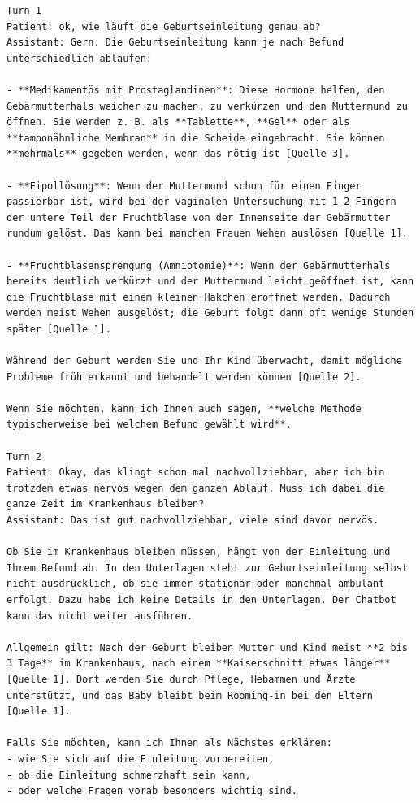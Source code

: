 \begin{Verbatim}[fontsize=\small,breaklines=true,breakanywhere=true]
Turn 1
Patient: ok, wie läuft die Geburtseinleitung genau ab?
Assistant: Gern. Die Geburtseinleitung kann je nach Befund unterschiedlich ablaufen:

- **Medikamentös mit Prostaglandinen**: Diese Hormone helfen, den Gebärmutterhals weicher zu machen, zu verkürzen und den Muttermund zu öffnen. Sie werden z. B. als **Tablette**, **Gel** oder als **tamponähnliche Membran** in die Scheide eingebracht. Sie können **mehrmals** gegeben werden, wenn das nötig ist [Quelle 3].

- **Eipollösung**: Wenn der Muttermund schon für einen Finger passierbar ist, wird bei der vaginalen Untersuchung mit 1–2 Fingern der untere Teil der Fruchtblase von der Innenseite der Gebärmutter rundum gelöst. Das kann bei manchen Frauen Wehen auslösen [Quelle 1].

- **Fruchtblasensprengung (Amniotomie)**: Wenn der Gebärmutterhals bereits deutlich verkürzt und der Muttermund leicht geöffnet ist, kann die Fruchtblase mit einem kleinen Häkchen eröffnet werden. Dadurch werden meist Wehen ausgelöst; die Geburt folgt dann oft wenige Stunden später [Quelle 1].

Während der Geburt werden Sie und Ihr Kind überwacht, damit mögliche Probleme früh erkannt und behandelt werden können [Quelle 2].

Wenn Sie möchten, kann ich Ihnen auch sagen, **welche Methode typischerweise bei welchem Befund gewählt wird**.

Turn 2
Patient: Okay, das klingt schon mal nachvollziehbar, aber ich bin trotzdem etwas nervös wegen dem ganzen Ablauf. Muss ich dabei die ganze Zeit im Krankenhaus bleiben?
Assistant: Das ist gut nachvollziehbar, viele sind davor nervös.

Ob Sie im Krankenhaus bleiben müssen, hängt von der Einleitung und Ihrem Befund ab. In den Unterlagen steht zur Geburtseinleitung selbst nicht ausdrücklich, ob sie immer stationär oder manchmal ambulant erfolgt. Dazu habe ich keine Details in den Unterlagen. Der Chatbot kann das nicht weiter ausführen.

Allgemein gilt: Nach der Geburt bleiben Mutter und Kind meist **2 bis 3 Tage** im Krankenhaus, nach einem **Kaiserschnitt etwas länger** [Quelle 1]. Dort werden Sie durch Pflege, Hebammen und Ärzte unterstützt, und das Baby bleibt beim Rooming-in bei den Eltern [Quelle 1].

Falls Sie möchten, kann ich Ihnen als Nächstes erklären:
- wie Sie sich auf die Einleitung vorbereiten,
- ob die Einleitung schmerzhaft sein kann,
- oder welche Fragen vorab besonders wichtig sind.


\end{Verbatim}
